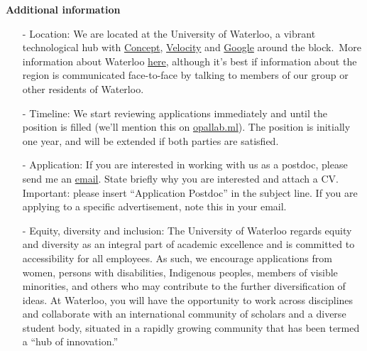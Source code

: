 \documentclass[12pt]{article}
\begin{document}

\noindent \textbf{Additional information}
\begin{itemize}
	\item[-] Location: We are located at the University of Waterloo, a vibrant technological hub with \href{https://concept.uwaterloo.ca}{Concept}, \href{https://velocityincubator.com}{Velocity} and \href{https://careers.google.com/locations/waterloo/}{Google} around the block.\ More information about Waterloo \href{https://www.waterloo.ca/en/index.aspx#}{here}, although it's best if information about the region is communicated face-to-face by talking to members of our group or other residents of Waterloo.\vspace{-0.3cm}
	\item[-] Timeline: We start reviewing applications immediately and until the position is filled (we'll mention this on \url{opallab.ml}). The position is initially one year, and will be extended if both parties are satisfied.\vspace{-0.3cm}
	\item[-] Application: If you are interested in working with us as a postdoc, please send me an \href{mailto:kimon.fountoulakis@uwaterloo.ca}{email}. State briefly why you are interested and attach a CV. Important: please insert ``Application Postdoc'' in the subject line. If you are applying to a specific advertisement, note this in your email.
	\item[-] Equity, diversity and inclusion: The University of Waterloo regards equity and diversity as an integral part of academic excellence and is committed to accessibility for all employees. As such, we encourage applications from women, persons with disabilities, Indigenous peoples, members of visible minorities, and others who may contribute to the further diversification of ideas. At Waterloo, you will have the opportunity to work across disciplines and collaborate with an international community of scholars and a diverse student body, situated in a rapidly growing community that has been termed a ``hub of innovation.''
\end{itemize}


\end{document}
